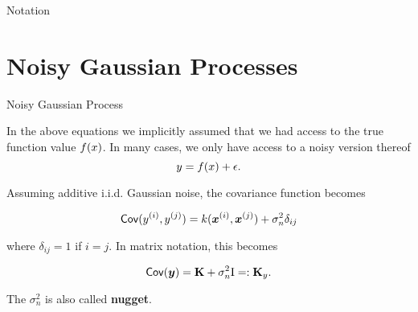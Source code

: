 \begin{vbframe}{Notation}




\end{vbframe}



\section{Noisy Gaussian Processes}

\begin{vbframe}{Noisy Gaussian Process}

In the above equations we implicitly assumed that we had access to the true function value $f(x)$. In many cases, we only have access to a noisy version thereof 
$$
y = f(x) + \epsilon.$$ 

Assuming additive i.i.d. Gaussian noise, the covariance function becomes

$$
\mathsf{Cov}(y^{(i)}, y^{(j)}) = k(\bm{x}^{(i)}, \bm{x}^{(j)}) + \sigma_n^2 \delta_{ij}
$$

where $\delta_{ij} = 1$ if $i = j$. In matrix notation, this becomes

$$
\mathsf{Cov}(\bm{y}) = \mathbf{K} + \sigma_n^2\mathrm{I} =: \mathbf{K}_y.  
$$

The $\sigma_n^2$ is also called \textbf{nugget}. 

\end{vbframe}

